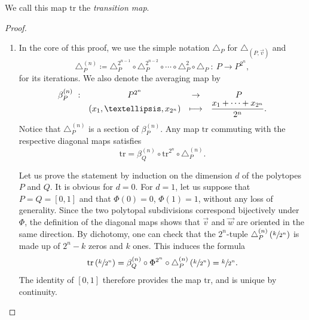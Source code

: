 \documentclass[11pt]{article}
\newcommand{\skpt}{\smallskip}
\numberwithin{equation}{section}\providecommand{\No}{}
\def\mto{\mathchoice{\longmapsto}{\mapsto}{\mapsto}{\mapsto}}
\let\dpl\displaystyle
\theoremstyle{plain}
\theoremstyle{definition}
\newcommand{\tr}{\mathrm{tr}}
\begin{document}
We call this map $\tr$ the \emph{transition map}.

\skpt
\begin{proof}
\begin{enumerate}
\item
In the core of this proof, we use the simple notation $\triangle_P$ for $\triangle_{(P, \vec v)}$ and
\[\triangle^{(n)}_P\coloneqq \triangle^{2^{n-1}}_P\circ \triangle^{2^{n-2}}_P\circ\cdots\circ\triangle^{2}_P\circ\triangle_P\ : \
P\to P^{2^{n}},\]
for its iterations.
We also denote the averaging map by
\begin{align*}
\begin{array}{rccc}
\beta^{(n)}_P\ : & P^{2^n}&\dpl\to &P\\
&(x_1, \ldots, x_{2^n}) & \dpl\mto&
\displaystyle \frac{x_1+\cdots+x_{2^n}}{2^n}.
\end{array}
\end{align*}
Notice that $\triangle^{(n)}_P$ is a section of $\beta^{(n)}_P$.
Any map $\tr$ commuting with the respective diagonal maps satisfies
\[\tr = \beta^{(n)}_Q\circ\tr^{2^n}\circ\triangle^{(n)}_P. \]

Let us prove the statement by induction on the dimension $d$ of the polytopes $P$ and $Q$. It is obvious for $d=0$. For $d=1$, let us suppose that $P=Q=[0,1]$ and that $\Phi(0)=0$, $\Phi(1)=1$, without any loss of generality.
Since the two polytopal subdivisions correspond bijectively under $\Phi$, the definition of the diagonal maps shows that $\vec v$ and $\vec w$ are oriented in the same direction. By dichotomy, one can check that the $2^n$-tuple $\triangle^{(n)}_P\left(\sfrac{k}{2^n}\right)$ is made up of $2^{n}-k$ zeros and $k$ ones. This induces the formula
\[\tr\left(\sfrac{k}{2^n}\right)
= \beta^{(n)}_Q\circ\Phi^{2^n}\circ\triangle^{(n)}_P\left(\sfrac{k}{2^n}\right)
= \sfrac{k}{2^n}. \]
The identity of $[0, 1]$ therefore provides the map $\tr$, and is unique by continuity.


\end{enumerate}
\end{proof}
\end{document}
